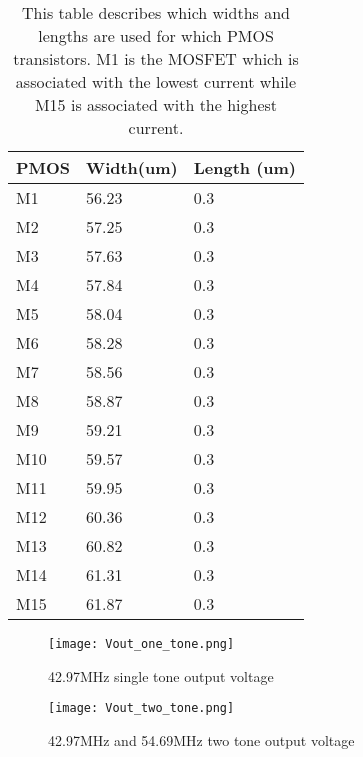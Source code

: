 \begin{appendices}
\begin{table}
\caption{This table describes which widths and lengths are used for which PMOS transistors. M1 is the MOSFET which is associated with the lowest current while M15 is associated with the highest current.} 
\begin{tabular}{l||l|l}
PMOS & Width(um) & Length (um) \\\hline\hline
M1 & 56.23 & 0.3\\\hline
M2 & 57.25 & 0.3\\\hline
M3 & 57.63 & 0.3\\\hline
M4 & 57.84& 0.3\\\hline
M5 & 58.04 & 0.3\\\hline
M6 & 58.28 & 0.3\\\hline
M7 & 58.56 & 0.3\\\hline
M8 & 58.87 & 0.3\\\hline
M9 & 59.21 & 0.3\\\hline
M10 & 59.57 & 0.3\\\hline
M11 & 59.95 & 0.3\\\hline
M12 & 60.36 & 0.3\\\hline
M13 & 60.82 & 0.3\\\hline
M14 & 61.31 & 0.3\\\hline
M15 & 61.87 & 0.3
\end{tabular}
\label{Tab:PMOS}
\end{table}

\begin{figure}[h] 
\texttt{[image: Vout\_one\_tone.png]}
\caption{42.97MHz single tone output voltage}
\label{fig:Vout_one_tone}
\end{figure}

\begin{figure}[h] 
\texttt{[image: Vout\_two\_tone.png]}
\caption{42.97MHz and 54.69MHz two tone output voltage}
\label{fig:Vout_two_tone}
\end{figure}
\end{appendices}